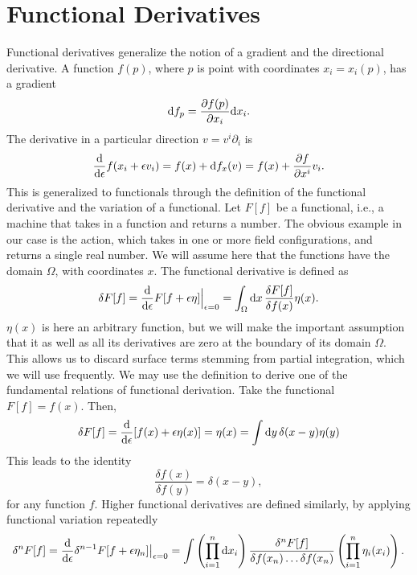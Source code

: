 \chapter{Functional Derivatives}
\label{section:Functional derivative}
Functional derivatives generalize the notion of a gradient and the directional derivative.
A function $f(p)$, where $p$ is point with coordinates $x_i = x_i(p)$, has a gradient
\begin{equation}
    \dd f_p = \pdv{f(p)}{x_i} \dd x_i.
\end{equation}
The derivative in a particular direction $v = v^i \partial_i$ is 
\begin{equation}
    \dv{\epsilon} f(x_i + \epsilon v_i) = f(x) + \dd f_x (v) = f(x) + \pdv{f}{x^i}v_i.
\end{equation}
This is generalized to functionals through the definition of the functional derivative and the variation of a functional.
Let $F[f]$ be a functional, i.e., a machine that takes in a function and returns a number.
The obvious example in our case is the action, which takes in one or more field configurations, and returns a single real number.
We will assume here that the functions have the domain $\Omega$, with coordinates $x$.
The functional derivative is defined as
\begin{equation}
    \delta F[f]
    =
    \dv{\epsilon} F[f + \epsilon \eta] \Big|_{\epsilon = 0}
    = \int_\Omega \dd x \, \frac{\delta F[f]}{\delta f(x)} \eta(x).
\end{equation}
$\eta(x)$ is here an arbitrary function, but we will make the important assumption that it as well as all its derivatives are zero at the boundary of its domain $\Omega$.
This allows us to discard surface terms stemming from partial integration, which we will use frequently.
We may use the definition to derive one of the fundamental relations of functional derivation.
Take the functional $F[f] = f(x)$. 
Then,
\begin{equation}
    \label{Functional derivative delta identity}
    \delta F[f] = \dv{\epsilon} [f(x) + \epsilon \eta(x)] = \eta(x) = \int \dd y \, \delta(x - y) \eta(y)
\end{equation}
This leads to the identity
\begin{equation}
    \frac{\delta f(x)}{\delta f(y)} = \delta(x - y),
\end{equation}
for any function $f$.
Higher functional derivatives are defined similarly, by applying functional variation repeatedly
\begin{equation}
    \delta^n F[f] = \dv{\epsilon} \delta^{n-1}F[f + \epsilon \eta_n] \big|_{\epsilon=0}
    = \int \left(\prod_{i=1}^n \dd x_i\right)
    \frac{\delta^n F[f]}{ \delta f(x_n)\dots\delta f(x_n)} \left(\prod_{i=1}^n \eta_i(x_i)\right).
\end{equation}
